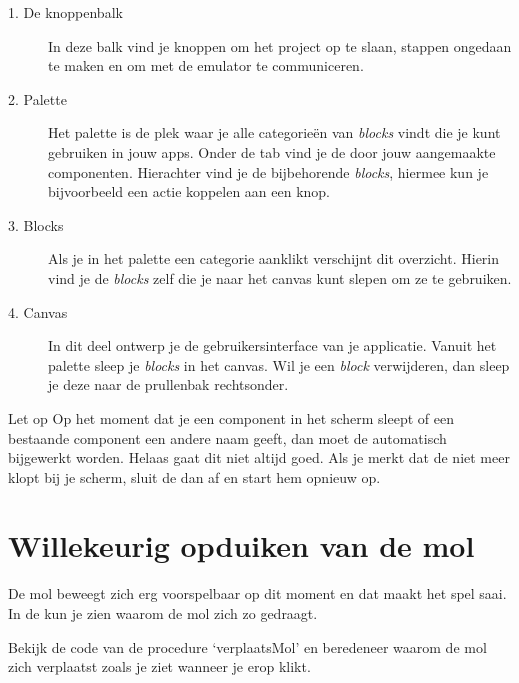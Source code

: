 
\begin{description}
  \item[1. De knoppenbalk] In deze balk vind je knoppen om het project op te slaan, stappen ongedaan te maken en om met de emulator te communiceren.
  \item[2. Palette] Het palette is de plek waar je alle categorie\"en van \emph{blocks} vindt die je kunt gebruiken in jouw apps. Onder de tab  vind je de door jouw aangemaakte componenten. Hierachter vind je de bijbehorende \emph{blocks}, hiermee kun je bijvoorbeeld een actie koppelen aan een knop.
  \item[3. Blocks] Als je in het palette een categorie aanklikt verschijnt dit overzicht. Hierin vind je de \emph{blocks} zelf die je naar het canvas kunt slepen om ze te gebruiken.
  \item[4. Canvas] In dit deel ontwerp je de gebruikersinterface van je applicatie. Vanuit het palette sleep je \emph{blocks} in het canvas. Wil je een \emph{block} verwijderen, dan sleep je deze naar de prullenbak rechtsonder.
\end{description}

\begin{derivation}{Let op}
Op het moment dat je een component in het  scherm sleept of een bestaande component een andere naam geeft, dan moet de  automatisch bijgewerkt worden. Helaas gaat dit niet altijd goed. Als je merkt dat de  niet meer klopt bij je  scherm, sluit de  dan af en start hem opnieuw op.
\end{derivation}

\section{Willekeurig opduiken van de mol}
De mol beweegt zich erg voorspelbaar op dit moment en dat maakt het spel saai. In de  kun je zien waarom de mol zich zo gedraagt.

\begin{opgave}
    \opgVraag
	Bekijk de code van de procedure `verplaatsMol' en beredeneer waarom de mol zich verplaatst 
	zoals je ziet wanneer je erop klikt. 
\end{opgave}

